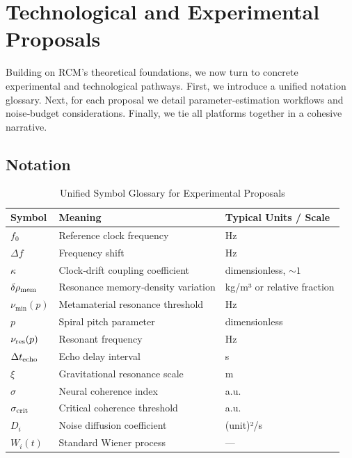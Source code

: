 \section{Technological and Experimental Proposals}

Building on RCM’s theoretical foundations, we now turn to concrete experimental and technological pathways.  First, we introduce a unified notation glossary.  Next, for each proposal we detail parameter‐estimation workflows and noise‐budget considerations.  Finally, we tie all platforms together in a cohesive narrative.

\subsection{Notation}
\begin{table}[ht]
  \centering
  \caption{Unified Symbol Glossary for Experimental Proposals}
  \label{tab:tech_notation}
  \begin{tabular}{@{}lll@{}}
    \toprule
    Symbol & Meaning & Typical Units / Scale \\
    \midrule
    $f_0$                & Reference clock frequency        & Hz \\
    $\Delta f$           & Frequency shift                  & Hz \\
    $\kappa$             & Clock‐drift coupling coefficient & dimensionless, $\sim1$ \\
    $\delta\rho_{\rm mem}$   & Resonance memory‐density variation & kg/m³ or relative fraction \\
    $\nu_{\min}(p)$      & Metamaterial resonance threshold & Hz \\
    $p$                  & Spiral pitch parameter           & dimensionless \\
    $\nu_{\rm res}(p)$   & Resonant frequency               & Hz \\
    $\Delta t_{\rm echo}$ & Echo delay interval             & s \\
    $\xi$                & Gravitational resonance scale    & m \\
    $\sigma$             & Neural coherence index           & a.u. \\
    $\sigma_{\rm crit}$  & Critical coherence threshold     & a.u. \\
    $D_i$                & Noise diffusion coefficient      & (unit)²/s \\
    $W_i(t)$             & Standard Wiener process          & — \\
    \bottomrule
  \end{tabular}
\end{table}

